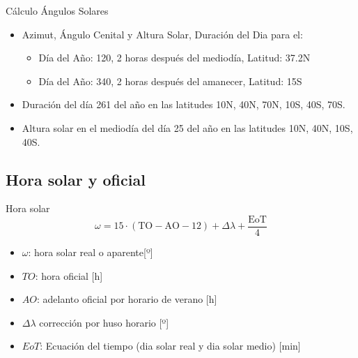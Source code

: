 \documentclass[xcolor={usenames,svgnames,dvipsnames}]{beamer}
\begin{document}
\begin{frame}[label={sec:orgdea330e}]{Cálculo Ángulos Solares}
\begin{itemize}
\item Azimut, Ángulo Cenital y Altura Solar, Duración del Dia para el:

\begin{itemize}
\item Día del Año: 120, 2 horas después del mediodía, Latitud: 37.2N

\item Día del Año: 340, 2 horas después del amanecer, Latitud: 15S
\end{itemize}

\item Duración del día 261 del año en las latitudes 10N, 40N, 70N, 10S,
40S, 70S.

\item Altura solar en el mediodía del día 25 del año en las latitudes 10N,
40N, 10S, 40S.
\end{itemize}
\end{frame}

\subsection{Hora solar y oficial}
\label{sec:orgbca83d9}
\begin{frame}[label={sec:org983cd08}]{Hora solar}
\[\omega=15\cdot(\mathrm{TO}-\mathrm{AO}-12)+\Delta\lambda+\frac{\mathrm{EoT}}{4}\]

\begin{itemize}
\item \(\omega\): hora solar real o aparente[º]
\item \(TO\): hora oficial [h]
\item \(AO\): adelanto oficial por horario de verano [h]
\item \(\Delta\lambda\) corrección por huso horario [º]
\item \(EoT\): Ecuación del tiempo (dia solar real y dia solar medio) [min]
\end{itemize}
\end{frame}
\end{document}
